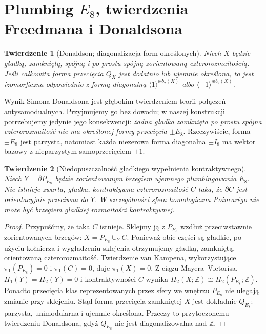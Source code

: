 \documentclass[11pt,a4paper]{report}
\numberwithin{equation}{section}
\theoremstyle{plain}
\newtheorem{twierdzenie}{Twierdzenie}[section]
\theoremstyle{definition}
\theoremstyle{remark}
\begin{document}
\section{Plumbing \texorpdfstring{$E_8$}{E8}, twierdzenia Freedmana i Donaldsona}
\label{sec:tg-plumbing-freedman}

\begin{twierdzenie}[Donaldson; diagonalizacja form określonych]
Niech $X$ będzie gładką, zamkniętą, spójną i po prostu
spójną zorientowaną czterorozmaitością. Jeśli całkowita
forma przecięcia $Q_X$ jest dodatnio lub ujemnie określona,
to jest izomorficzna odpowiednio z formą diagonalną
$\langle1\rangle^{\oplus b_2(X)}$ albo
$\langle-1\rangle^{\oplus b_2(X)}$.
\end{twierdzenie}

Wynik Simona Donaldsona jest głębokim twierdzeniem
teorii połączeń antysamodualnych. Przyjmujemy go bez dowodu;
w naszej konstrukcji potrzebujemy jedynie jego konsekwencji:
\emph{żadna gładka zamknięta po prostu spójna czterorozmaitość
nie ma określonej formy przecięcia $\pm E_8$}.
Rzeczywiście, forma $\pm E_8$ jest parzysta, natomiast każda
niezerowa forma diagonalna $\pm I_8$ ma wektor bazowy
z nieparzystym samoprzecięciem $\pm1$.

\begin{twierdzenie}[Niedopuszczalność gładkiego wypełnienia kontraktywnego]
\label{thm:tg-E8-no-smooth-fill}
Niech $Y=\partial P_{E_8}$ będzie zorientowanym brzegiem
ujemnego plumbingowania $E_8$. Nie istnieje zwarta,
gładka, kontraktywna czterorozmaitość $C$ taka, że
$\partial C$ jest orientacyjnie przeciwna do $Y$.
W szczególności sfera homologiczna Poincarégo nie może
być brzegiem gładkiej rozmaitości kontraktywnej.
\end{twierdzenie}
\begin{proof}
Przypuśćmy, że taka $C$ istnieje. Sklejmy ją z
$P_{E_8}$ wzdłuż przeciwstawnie zorientowanych brzegów:
$X=P_{E_8}\cup_Y C$. Ponieważ obie części są gładkie,
po użyciu kołnierza i wygładzeniu sklejenia otrzymujemy
gładką, zamkniętą, orientowaną czterorozmaitość.
Twierdzenie van Kampena, wykorzystujące
$\pi_1(P_{E_8})=0$ i $\pi_1(C)=0$, daje
$\pi_1(X)=0$. Z ciągu Mayera--Vietorisa,
$H_1(Y)=H_2(Y)=0$ i kontraktywności $C$ wynika
$H_2(X;\mathbb Z)\cong H_2(P_{E_8};\mathbb Z)$.
Ponadto przecięcia klas reprezentowanych przez sfery
we wnętrzu $P_{E_8}$ nie ulegają zmianie przy sklejeniu.
Stąd forma przecięcia zamkniętej $X$ jest dokładnie
$Q_{E_8}$: parzysta, unimodularna i ujemnie określona.
Przeczy to przytoczonemu twierdzeniu Donaldsona,
gdyż $Q_{E_8}$ nie jest diagonalizowalna nad $\mathbb Z$.
\end{proof}
\end{document}
